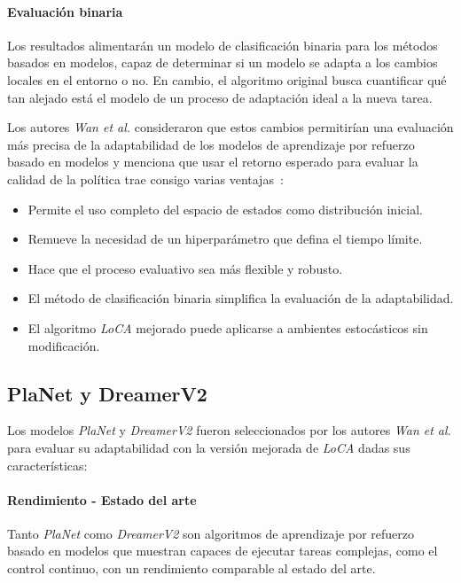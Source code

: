 \paragraph{Evaluación binaria}
Los resultados alimentarán un modelo de clasificación binaria para los métodos basados en modelos, capaz de determinar si un modelo se adapta a los cambios locales en el entorno o no.
En cambio, el algoritmo original busca cuantificar qué tan alejado está el modelo de un proceso de adaptación ideal a la nueva tarea.

Los autores \textit{Wan et al.} consideraron que estos cambios permitirían una evaluación más precisa de la adaptabilidad de los modelos de aprendizaje por refuerzo basado en modelos y menciona que usar el retorno esperado para evaluar la calidad de la política trae consigo varias ventajas~\cite{YiWan_2022}:

\begin{itemize}
    \item Permite el uso completo del espacio de estados como distribución inicial.
    \item Remueve la necesidad de un hiperparámetro que defina el tiempo límite.
    \item Hace que el proceso evaluativo sea más flexible y robusto.
    \item El método de clasificación binaria simplifica la evaluación de la adaptabilidad.
    \item El algoritmo \textit{LoCA} mejorado puede aplicarse a ambientes estocásticos sin modificación.
\end{itemize}

\subsection{PlaNet y DreamerV2}\label{subsec:planet-y-dreamerv2}

Los modelos \textit{PlaNet} y \textit{DreamerV2} fueron seleccionados por los autores \textit{Wan et al.} para evaluar su adaptabilidad con la versión mejorada de \textit{LoCA} dadas sus características:

\paragraph{Rendimiento - Estado del arte}
Tanto \textit{PlaNet} como \textit{DreamerV2} son algoritmos de aprendizaje por refuerzo basado en modelos que muestran capaces de ejecutar tareas complejas, como el control continuo, con un rendimiento comparable al estado del arte.

